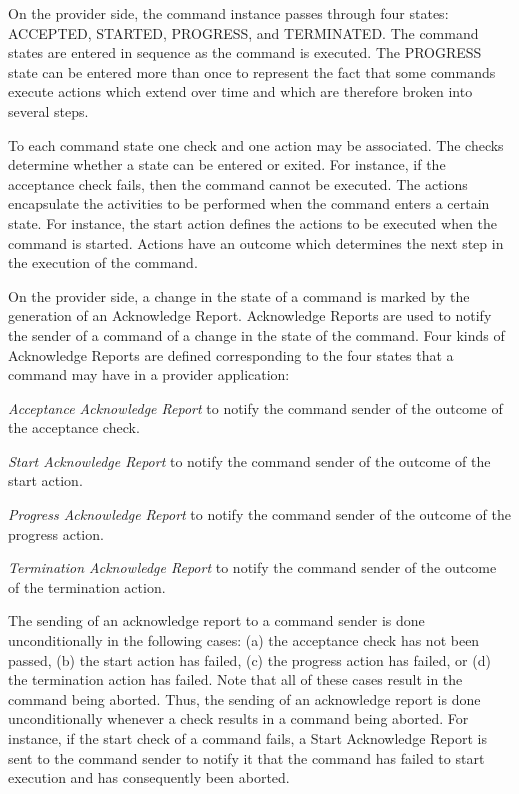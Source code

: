 On the provider side, the command instance passes through four states: ACCEPTED, STARTED, PROGRESS, and TERMINATED. The command states are entered in sequence as the command is executed. The PROGRESS state can be entered more than once to represent the fact that some commands execute actions which extend over time and which are therefore broken into several steps.

To each command state one check and one action may be associated. The checks determine whether a state can be entered or exited. For instance, if the acceptance check fails, then the command cannot be executed. The actions encapsulate the activities to be performed when the command enters a certain state. For instance, the start action defines the actions to be executed when the command is started. Actions have an outcome which determines the next step in the execution of the command.

On the provider side, a change in the state of a command is marked by the generation of an Acknowledge Report. Acknowledge Reports are used to notify the sender of a command of a change in the state of the command. Four kinds of Acknowledge Reports are defined corresponding to the four states that a command may have in a provider application:

\begin{fw_itemize}
\item{\textit{Acceptance Acknowledge Report}} to notify the command sender of the outcome of the acceptance check.
\item{\textit{Start Acknowledge Report}} to notify the command sender of the outcome of the start action.
\item{\textit{Progress Acknowledge Report}} to notify the command sender of the outcome of the progress action.
\item{\textit{Termination Acknowledge Report}} to notify the command sender of the outcome of the termination action.
\end{fw_itemize}

The sending of an acknowledge report to a command sender is done unconditionally in the following cases: (a) the acceptance check has not been passed, (b) the start action has failed, (c) the progress action has failed, or (d) the termination action has failed. Note that all of these cases result in the command being aborted. Thus, the sending of an acknowledge report is done unconditionally whenever a check results in a command being aborted. For instance, if the start check of a command fails, a Start Acknowledge Report is sent to the command sender to notify it that the command has failed to start execution and has consequently been aborted.

